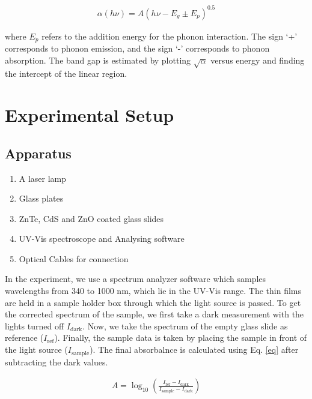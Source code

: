 \begin{align}
    \alpha(h\nu) = A(h\nu - E_g \pm E_p)^{0.5}
\end{align}

where $E_p$ refers to the addition energy for the phonon interaction. The sign `+' corresponds to phonon emission, and the sign `-' corresponds to phonon absorption. The band gap is estimated by plotting $\sqrt{\alpha}$ versus energy and finding the intercept of the linear region.

\section{Experimental Setup}

\subsection*{Apparatus}

\begin{enumerate}
    \item A laser lamp
    \item Glass plates
    \item ZnTe, CdS and ZnO coated glass slides
    \item UV-Vis spectroscope and Analysing software
    \item Optical Cables for connection\\
\end{enumerate}

In the experiment, we use a spectrum analyzer software which samples wavelengths from 340 to 1000 nm, which lie in the UV-Vis range. The thin films are held in a sample holder box  through which the light source is passed. To get the corrected spectrum of the sample, we first take a dark measurement with the lights turned off $I_\text{dark}$. Now, we take the spectrum of the empty glass slide as reference ($I_\text{ref}$). Finally, the sample data is taken by placing the sample in front of the light source ($I_\text{sample}$). The final absorbalnce is calculated using Eq. \ref{eq} after subtracting the dark values.

\begin{align}
    A = \log_{10} \left(\frac{I_\text{ref}-I_\text{dark}}{I_\text{sample}-I_\text{dark}}\right)
\end{align}